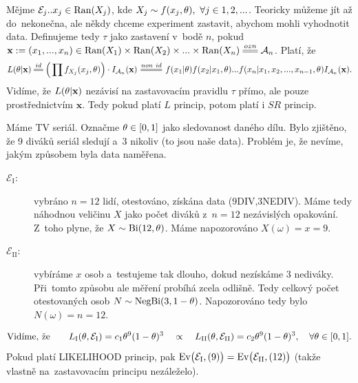 \begin{example}
	Mějme $\mathcal{E}_j..x_j\in\mathop{\mathrm{Ran}}(X_j)$, kde $X_j\sim f(x_j,\theta),~\forall j\in 1,2,...$. Teoricky můžeme jít až do~nekonečna, ale někdy chceme experiment zastavit, abychom mohli vyhodnotit data. Definujeme tedy $\tau$ jako zastavení v~bodě $n$, pokud $\textbf{x}:=(x_1,...,x_n)\in\Ran(X_1)\times\Ran(X_2)\times...\times\Ran(X_n)\equal{ozn}\Aa_n$. Platí, že
	$$ L(\t|\textbf{x})\equal{id}\Big(\prod f_{X_j}(x_j,\t) \Big)\cdot I_{\Aa_n}(\textbf{x})\equal{non~id}f(x_1|\t)f(x_2|x_1,\t)...f(x_n|x_1,x_2,...,x_{n-1},\t)I_{\Aa_n}(\textbf{x}).$$
	Vidíme, že $L(\theta|\textbf{x})$ nezávisí na zastavovacím pravidlu $\tau$ přímo, ale pouze prostřednictvím $\textbf{x}$. Tedy pokud platí $L$ princip, potom platí i $SR$ princip.
\end{example}
\begin{example}
	Máme TV seriál. Označme $\theta\in[0,1]$ jako sledovanost daného dílu. Bylo zjištěno, že 9 diváků seriál sledují a~3 nikoliv (to jsou naše data). Problém je, že nevíme, jakým způsobem byla data naměřena. 
	\begin{description}
		\item[$\mathcal{E}_\mathrm{I}:$] vybráno $n=12$ lidí, otestováno, získána data (9DIV,3NEDIV). Máme tedy náhodnou veličinu $X$ jako počet diváků z~$n=12$ nezávislých opakování. Z~toho plyne, že $X\sim \mathrm{Bi}(12,\theta)$. Máme napozorováno $X(\omega)=x=9$.
		\item[$\mathcal{E}_\mathrm{II}:$] vybíráme $x$ osob a~testujeme tak dlouho, dokud nezískáme $3$ nediváky. Při~tomto způsobu ale měření probíhá zcela odlišně. Tedy celkový počet otestovaných osob \mbox{$N\sim\mathrm{NegBi}(3,1-\theta)$}. Napozorováno tedy bylo $N(\omega)=n=12$.
	\end{description}
	$$ \text{Vidíme, že}\qquad L_\mathrm{I}(\theta,\mathcal{E}_\mathrm{I})=c_1\theta^9(1-\theta)^3\quad\propto\quad L_\mathrm{II}(\theta,\mathcal{E}_\mathrm{II})=c_2\theta^9(1-\theta)^3,\quad \forall\theta\in[0,1]. $$
	Pokud platí LIKELIHOOD princip, pak $\mathrm{Ev}\big(\mathcal{E}_\mathrm{I},(9)\big)=\mathrm{Ev}\big(\mathcal{E}_\mathrm{II},(12)\big)$ (takže vlastně na~zastavovacím principu nezáleželo).
\end{example}

